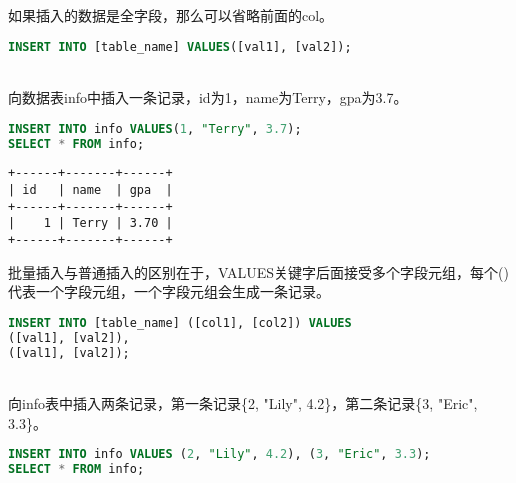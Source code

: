 \documentclass[12pt, openany, oneside]{book}
\begin{document}
如果插入的数据是全字段，那么可以省略前面的col。

\vspace{-0.5cm}

\begin{lstlisting}[language=SQL]
INSERT INTO [table_name] VALUES([val1], [val2]);
\end{lstlisting}

\vspace{0.5cm}

\\

向数据表info中插入一条记录，id为1，name为Terry，gpa为3.7。

\vspace{-0.5cm}

\begin{lstlisting}[language=SQL]
INSERT INTO info VALUES(1, "Terry", 3.7);
SELECT * FROM info;
\end{lstlisting}

\begin{tcolorbox}
	\begin{verbatim}
+------+-------+------+
| id   | name  | gpa  |
+------+-------+------+
|    1 | Terry | 3.70 |
+------+-------+------+
\end{verbatim}
\end{tcolorbox}

批量插入与普通插入的区别在于，VALUES关键字后面接受多个字段元组，每个()代表一个字段元组，一个字段元组会生成一条记录。

\vspace{-0.5cm}

\begin{lstlisting}[language=SQL]
INSERT INTO [table_name] ([col1], [col2]) VALUES
([val1], [val2]),
([val1], [val2]);
\end{lstlisting}

\vspace{0.5cm}

\\

向info表中插入两条记录，第一条记录\{2, "Lily", 4.2\}，第二条记录\{3, "Eric", 3.3\}。

\vspace{-0.5cm}

\begin{lstlisting}[language=SQL]
INSERT INTO info VALUES (2, "Lily", 4.2), (3, "Eric", 3.3);
SELECT * FROM info;
\end{lstlisting}
\end{document}
